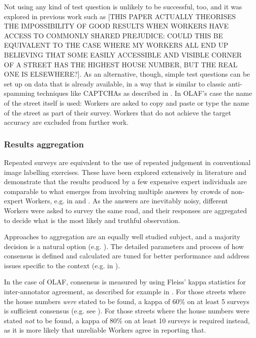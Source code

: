 Not using any kind of test question is unlikely to be successful, too, and it was explored in previous work such as \cite{DellaPenna:tf} [THIS PAPER ACTUALLY THEORISES THE IMPOSSIBILITY OF GOOD RESULTS WHEN WORKERS HAVE ACCESS TO COMMONLY SHARED PREJUDICE: COULD THIS BE EQUIVALENT TO THE CASE WHERE MY WORKERS ALL END UP BELIEVING THAT SOME EASILY ACCESSIBLE AND VISIBLE CORNER OF A STREET HAS THE HIGHEST HOUSE NUMBER, BUT THE REAL ONE IS ELSEWHERE?]. As an alternative, though, simple test questions can be set up on data that is already available, in a way that is similar to classic anti-spamming techniques like CAPTCHAs as described in \cite{Difallah:2012ty}. In OLAF's case the name of the street itself is used: Workers are asked to copy and paste or type the name of the street as part of their survey. Workers that do not achieve the target accuracy are excluded from further work.

\subsubsection{Results aggregation}

Repeated surveys are equivalent to the use of repeated judgement in conventional image labelling exercises. These have been explored extensively in literature and demonstrate that the results produced by a few expensive expert individuals are comparable to what emerges from involving multiple answers by crowds of non-expert Workers, e.g. in \cite{Snow:2008wo} and \cite{Sheng:2008gra}. As the answers are inevitably noisy, different Workers were asked to survey the same road, and their responses are aggregated to decide what is the most likely and truthful observation. 
        
Approaches to aggregation are an equally well studied subject, and a majority decision is a natural option (e.g. \cite{Le:2010ug}). The detailed parameters and process of how consensus is defined and calculated are tuned for better performance and address issues specific to the context (e.g. in \cite{Hirth:2011fh}). 

In the case of OLAF, consensus is measured by using Fleiss' kappa statistics for inter-annotator agreement, as described for example in \cite{Nowak:2010gt}. For those streets where the house numbers {\it were} stated to be found, a kappa of 60\% on at least 5 surveys is sufficient consensus (e.g. see \cite{Landis:1977kv}). For those streets where the house numbers were stated {\it not} to be found, a kappa of 80\% on at least 10 surveys is required instead, as it is more likely that unreliable Workers agree in reporting that.

